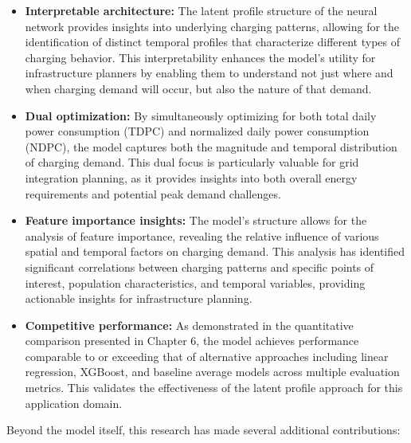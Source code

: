 \begin{itemize}
    \item \textbf{Interpretable architecture:} The latent profile structure of the neural network provides insights into underlying charging patterns, allowing for the identification of distinct temporal profiles that characterize different types of charging behavior. This interpretability enhances the model's utility for infrastructure planners by enabling them to understand not just where and when charging demand will occur, but also the nature of that demand.

    \item \textbf{Dual optimization:} By simultaneously optimizing for both total daily power consumption (TDPC) and normalized daily power consumption (NDPC), the model captures both the magnitude and temporal distribution of charging demand. This dual focus is particularly valuable for grid integration planning, as it provides insights into both overall energy requirements and potential peak demand challenges.

    \item \textbf{Feature importance insights:} The model's structure allows for the analysis of feature importance, revealing the relative influence of various spatial and temporal factors on charging demand. This analysis has identified significant correlations between charging patterns and specific points of interest, population characteristics, and temporal variables, providing actionable insights for infrastructure planning.

    \item \textbf{Competitive performance:} As demonstrated in the quantitative comparison presented in Chapter 6, the model achieves performance comparable to or exceeding that of alternative approaches including linear regression, XGBoost, and baseline average models across multiple evaluation metrics. This validates the effectiveness of the latent profile approach for this application domain.
\end{itemize}

Beyond the model itself, this research has made several additional contributions:

